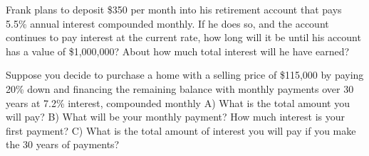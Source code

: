 \documentclass[11pt,epsfig]{article}
\begin{document}
\begin{problem}{12}
Frank plans to deposit \$350 per month into his retirement account that pays 5.5\% annual interest compounded monthly. If he does so, and the account continues to pay interest at the current rate, how long will it be until his account has a value of \$1,000,000? About how much total interest will he have earned?

\vfill
\end{problem}
\newpage
\begin{problem}{12}
Suppose you decide to purchase a home with a selling price of \$115,000 by paying 20\% down and financing the remaining balance with monthly payments over 30 years at 7.2\% interest, compounded monthly
\newline
A) What is the total amount you will pay?
\newline
B) What will be your monthly payment? How much interest is your first payment?
\newline
C) What is the total amount of interest you will pay if you make the 30 years of payments?


\vfill
\end{problem}



\showpoints
\end{document}

